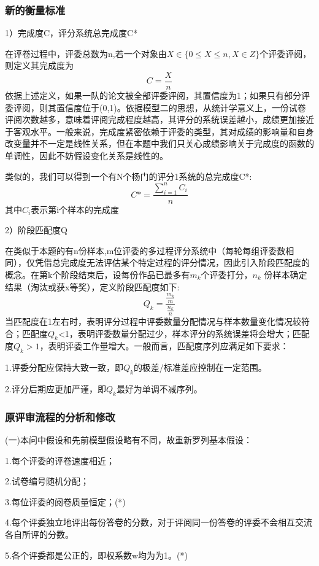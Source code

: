 \documentclass{my_paper}
\begin{document}
	 \subsubsection{新的衡量标准}
	 1）完成度C，评分系统总完成度C*
	 
	 在评卷过程中，评委总数为n,若一个对象由$X\in \{0 \leq X \leq n,X \in Z\}$个评委评阅，则定义其完成度为
	 $$C=\frac{X}{n}$$
	 依据上述定义，如果一队的论文被全部评委评阅，其置信度为1；如果只有部分评委评阅，则其置信度位于(0,1)。依据模型二的思想，从统计学意义上，一份试卷评阅次数越多，意味着评阅完成程度越高，其评分的系统误差越小，成绩更加接近于客观水平。一般来说，完成度紧密依赖于评委的类型，其对成绩的影响量和自身改变量并不一定是线性关系，但在本题中我们只关心成绩影响关于完成度的函数的单调性，因此不妨假设变化关系是线性的。
	 
	 类似的，我们可以得到一个有N个杨门的评分1系统的总完成度C*:
	 $$C*=\displaystyle \frac{\displaystyle \sum_{i=1}^{n} C_i}{n}$$
	 其中$C_i$表示第i个样本的完成度
	 
	 2）阶段匹配度Q
	 
	 在类似于本题的有n份样本,m位评委的多过程评分系统中（每轮每组评委数相同），仅凭借总完成度无法评估某个特定过程的评分情况，因此引入阶段匹配度的概念。在第k个阶段结束后，设每份作品已最多有$m_k $个评委打分，$n_k$ 份样本确定结果（淘汰或获x等奖），定义阶段匹配度如下:
	 $$Q_k=\displaystyle\frac{\frac{m_k}{m}}{\frac{n_k}{n}}$$
	 当匹配度在1左右时，表明评分过程中评委数量分配情况与样本数量变化情况较符合；匹配度$Q_k$<1，表明评委数量分配过少，样本评分的系统误差将会增大；匹配度$Q_k>1$，表明评委工作量增大。一般而言，匹配度序列应满足如下要求：
	 
	 1.评委分配应保持大致一致，即$Q_k$的极差/标准差应控制在一定范围。
	 
	 2.评分后期应更加严谨，即$Q_k$最好为单调不减序列。
	 
	 \subsubsection{原评审流程的分析和修改}
	 (一)本问中假设和先前模型假设略有不同，故重新罗列基本假设：
	 
	 1.每个评委的评卷速度相近；
	 
	 2.试卷编号随机分配；
	 
	 3.每位评委的阅卷质量恒定；(*)
	 
	 4.每个评委独立地评出每份答卷的分数，对于评阅同一份答卷的评委不会相互交流各自所评的分数。
	 
	 5.各个评委都是公正的，即权系数w均为为1。(*)
	 
\end{document}
